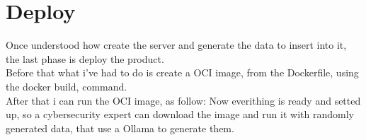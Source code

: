 \chapter{Deploy}
Once understood how create the server and generate the data to insert into it, the last phase is deploy the product.
\\ 
Before that what i've had to do is create a OCI image, from the Dockerfile, using the docker build, command.
\\
After that i can run the OCI image, as follow:
Now everithing is ready and setted up, so a cybersecurity expert can download the image and run it with randomly generated data, that use a Ollama to generate them.
